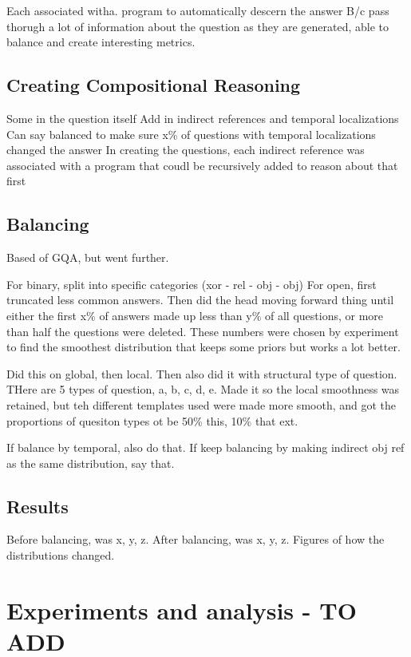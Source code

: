 \documentclass[10pt,twocolumn,letterpaper]{article}
\begin{document}
Each associated witha. program to automatically descern the answer
B/c pass thorugh a lot of information about the question as they are generated, able to balance and create interesting metrics. 

\subsection{Creating Compositional Reasoning}
Some in the question itself
Add in indirect references and temporal localizations
Can say balanced to make sure x\% of questions with temporal localizations changed the answer
In creating the questions, each indirect reference was associated with a program that coudl be recursively added to reason about that first

\subsection{Balancing}
Based of GQA, but went further. 

For binary, split into specific categories (xor - rel - obj - obj)
For open, first truncated less common answers. Then did the head moving forward thing until either the first x\% of answers made up less than y\% of all questions, or more than half the questions were deleted. These numbers were chosen by experiment to find the smoothest distribution that keeps some priors but works a lot better.

Did this on global, then local. Then also did it with structural type of question. THere are 5 types of question, a, b, c, d, e. Made it so the local smoothness was retained, but teh different templates used were made more smooth, and got the proportions of quesiton types ot be 50\% this, 10\% that ext. 

If balance by temporal, also do that. If keep balancing by making indirect obj ref as the same distribution, say that.


\subsection{Results}
Before balancing, was x, y, z. After balancing, was x, y, z. Figures of how the distributions changed. 


\section{Experiments and analysis - TO ADD}
\end{document}
